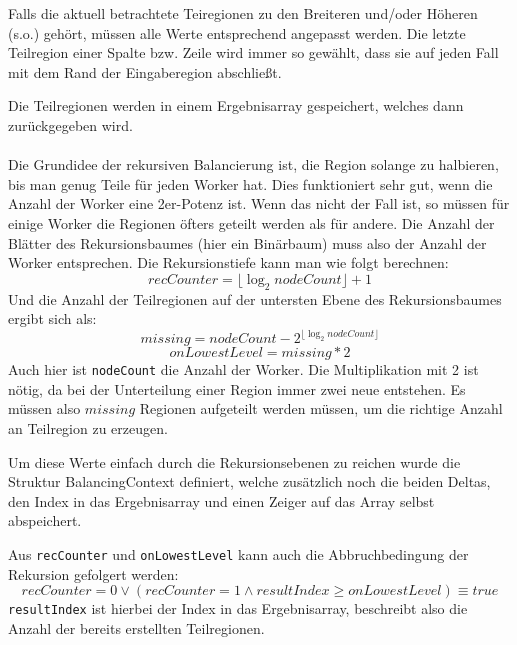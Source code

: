 Falls die aktuell betrachtete Teiregionen zu den Breiteren und/oder Höheren (s.o.) gehört, müssen alle Werte entsprechend angepasst werden.
Die letzte Teilregion einer Spalte bzw. Zeile wird immer so gewählt, dass sie auf jeden Fall mit dem Rand der Eingaberegion abschließt.

Die Teilregionen werden in einem Ergebnisarray gespeichert, welches dann zurückgegeben wird.

\paragraph*{} \label{lastbalancierung_naiv_rekursion}
Die Grundidee der rekursiven Balancierung ist, die Region solange zu halbieren, bis man genug Teile für jeden Worker hat.
Dies funktioniert sehr gut, wenn die Anzahl der Worker eine 2er-Potenz ist. Wenn das nicht der Fall ist, so müssen für einige Worker die Regionen öfters geteilt werden als für andere.
Die Anzahl der Blätter des Rekursionsbaumes (hier ein Binärbaum) muss also der Anzahl der Worker entsprechen.
Die Rekursionstiefe kann man wie folgt berechnen:
\begin{equation} \label{lastbalancierung_rekursion_tiefe}
	recCounter = \lfloor\log_2 nodeCount\rfloor + 1
\end{equation}
Und die Anzahl der Teilregionen auf der untersten Ebene des Rekursionsbaumes ergibt sich als:
\begin{equation*}
	missing = nodeCount - 2^{\lfloor\log_2 nodeCount\rfloor}
\end{equation*}
\begin{equation} \label{lastbalancierung_rekursion_ebene}
	onLowestLevel = missing * 2
\end{equation}
Auch hier ist \verb|nodeCount| die Anzahl der Worker. Die Multiplikation mit 2 ist nötig, da bei der Unterteilung einer Region immer zwei neue entstehen. Es müssen also $missing$ Regionen aufgeteilt werden müssen, um die richtige Anzahl an Teilregion zu erzeugen.

Um diese Werte einfach durch die Rekursionsebenen zu reichen wurde die Struktur BalancingContext definiert, welche zusätzlich noch die beiden Deltas, den Index in das Ergebnisarray und einen Zeiger auf das Array selbst abspeichert.

Aus \verb|recCounter| und \verb|onLowestLevel| kann auch die Abbruchbedingung der Rekursion gefolgert werden:
\begin{equation} \label{lastbalancierung_rekursion_abbruch}
	recCounter = 0 \vee (recCounter = 1 \wedge resultIndex \geq onLowestLevel) \equiv true
\end{equation}
\verb|resultIndex| ist hierbei der Index in das Ergebnisarray, beschreibt also die Anzahl der bereits erstellten Teilregionen.

